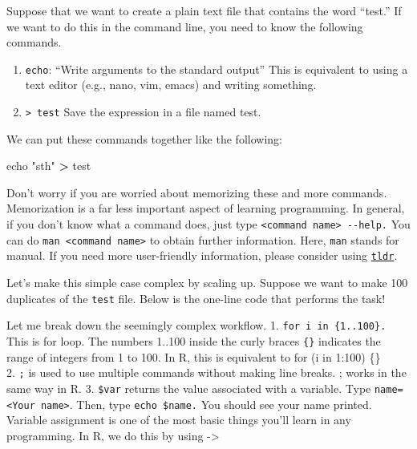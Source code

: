 \documentclass[
]{book}
\newenvironment{Shaded}{\begin{snugshade}}{\end{snugshade}}
\newcommand{\BuiltInTok}[1]{#1}
\newcommand{\ControlFlowTok}[1]{\textcolor[rgb]{0.13,0.29,0.53}{\textbf{#1}}}
\newcommand{\DataTypeTok}[1]{\textcolor[rgb]{0.13,0.29,0.53}{#1}}
\newcommand{\DecValTok}[1]{\textcolor[rgb]{0.00,0.00,0.81}{#1}}
\newcommand{\FunctionTok}[1]{\textcolor[rgb]{0.00,0.00,0.00}{#1}}
\newcommand{\KeywordTok}[1]{\textcolor[rgb]{0.13,0.29,0.53}{\textbf{#1}}}
\newcommand{\NormalTok}[1]{#1}
\newcommand{\OperatorTok}[1]{\textcolor[rgb]{0.81,0.36,0.00}{\textbf{#1}}}
\newcommand{\StringTok}[1]{\textcolor[rgb]{0.31,0.60,0.02}{#1}}
\newcommand{\VariableTok}[1]{\textcolor[rgb]{0.00,0.00,0.00}{#1}}
\providecommand{\tightlist}{%
  \setlength{\itemsep}{0pt}\setlength{\parskip}{0pt}}
\begin{document}
Suppose that we want to create a plain text file that contains the word ``test.'' If we want to do this in the command line, you need to know the following commands.

\begin{enumerate}
\def\labelenumi{\arabic{enumi}.}
\tightlist
\item
  \texttt{echo}: ``Write arguments to the standard output'' This is equivalent to using a text editor (e.g., nano, vim, emacs) and writing something.
\item
  \texttt{\textgreater{}\ test} Save the expression in a file named test.
\end{enumerate}

We can put these commands together like the following:

\begin{Shaded}
\begin{Highlighting}[]
\BuiltInTok{echo} \StringTok{"sth"} \OperatorTok{\textgreater{}}\NormalTok{ test }
\end{Highlighting}
\end{Shaded}

Don't worry if you are worried about memorizing these and more commands. Memorization is a far less important aspect of learning programming. In general, if you don't know what a command does, just type \texttt{\textless{}command\ name\textgreater{}\ -\/-help.} You can do \texttt{man\ \textless{}command\ name\textgreater{}} to obtain further information. Here, \texttt{man} stands for manual. If you need more user-friendly information, please consider using \href{https://tldr.sh/}{\texttt{tldr}}.

Let's make this simple case complex by scaling up. Suppose we want to make 100 duplicates of the \texttt{test} file. Below is the one-line code that performs the task!

\begin{Shaded}
\end{Shaded}

Let me break down the seemingly complex workflow.
1. \texttt{for\ i\ in\ \{1..100\}.} This is for loop. The numbers 1..100 inside the curly braces \texttt{\{\}} indicates the range of integers from 1 to 100. In R, this is equivalent to for (i in 1:100) \{\}\\
2. \texttt{;} is used to use multiple commands without making line breaks. ; works in the same way in R.
3. \texttt{\$var} returns the value associated with a variable. Type \texttt{name=\textless{}Your\ name\textgreater{}}. Then, type \texttt{echo\ \$name.} You should see your name printed. Variable assignment is one of the most basic things you'll learn in any programming. In R, we do this by using -\textgreater{}
\end{document}
